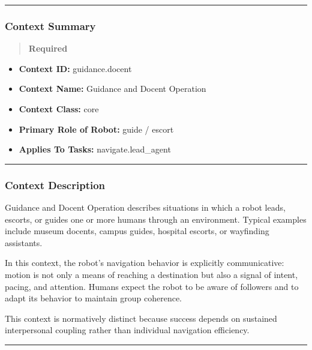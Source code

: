 \documentclass[utf8]{frontiers_suppmat} %
\providecommand{\tightlist}{%
  \setlength{\itemsep}{0pt}\setlength{\parskip}{0pt}}
\begin{document}
\begin{center}\rule{0.5\linewidth}{0.5pt}\end{center}

\subsubsection{Context Summary}\label{context-summary}

\begin{quote}
\textbf{Required}
\end{quote}

\begin{itemize}
\tightlist
\item
  \textbf{Context ID:} guidance.docent
\item
  \textbf{Context Name:} Guidance and Docent Operation
\item
  \textbf{Context Class:} core
\item
  \textbf{Primary Role of Robot:} guide / escort
\item
  \textbf{Applies To Tasks:} navigate.lead\_agent
\end{itemize}

\begin{center}\rule{0.5\linewidth}{0.5pt}\end{center}

\subsubsection{Context Description}\label{context-description}

Guidance and Docent Operation describes situations in which a robot
leads, escorts, or guides one or more humans through an environment.
Typical examples include museum docents, campus guides, hospital
escorts, or wayfinding assistants.

In this context, the robot's navigation behavior is explicitly
communicative: motion is not only a means of reaching a destination but
also a signal of intent, pacing, and attention. Humans expect the robot
to be aware of followers and to adapt its behavior to maintain group
coherence.

This context is normatively distinct because success depends on
sustained interpersonal coupling rather than individual navigation
efficiency.

\begin{center}\rule{0.5\linewidth}{0.5pt}\end{center}
\end{document}
